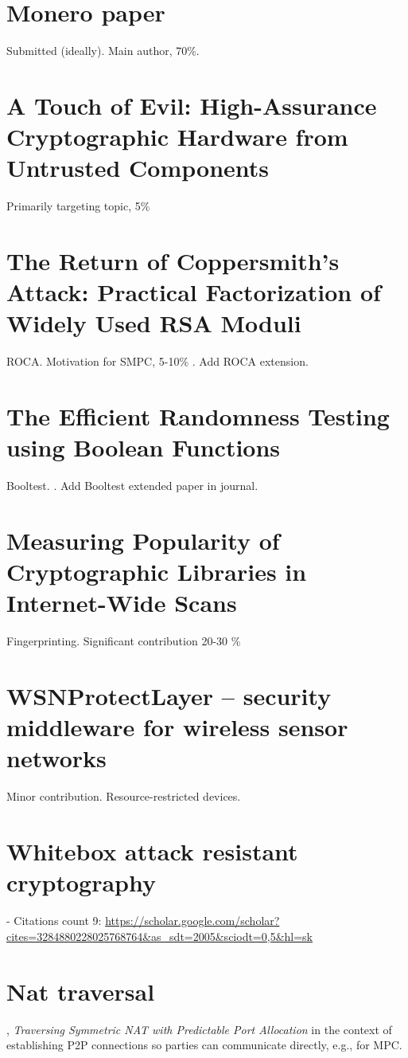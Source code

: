 \documentclass[
  digital, %
  twoside, %
  table,   %
  lof,     %
  lot,     %
]{fithesis3}
\newcounter{ph4_show_guides}
\theoremstyle{definition}
\theoremstyle{remark}
\begin{document}
\begin{ecmmnt} %
\section{Monero paper}
Submitted (ideally). Main author, 70\%.

\section{A Touch of Evil: High-Assurance Cryptographic Hardware from Untrusted Components}
Primarily targeting topic, 5\% \cite{2017-ccs-mavroudis}

\section{The Return of Coppersmith's Attack: Practical Factorization of Widely Used RSA Moduli}
ROCA. Motivation for SMPC, 5-10\% \cite{2017-ccs-nemec}.
Add ROCA extension.

\section{The Efficient Randomness Testing using Boolean Functions}
Booltest. \cite{booltest_secrypt2017}.
Add Booltest extended paper in journal.

\section{Measuring Popularity of Cryptographic Libraries in Internet-Wide Scans}
Fingerprinting. Significant contribution 20-30 \% \cite{2017-acsac-nemec}

\section{WSNProtectLayer – security middleware for wireless sensor networks}
Minor contribution. Resource-restricted devices. \cite{wsnprotectlayer}

\section{Whitebox attack resistant cryptography}
\cite{whitebox_klinec_santacrypt2013, Klinec2013thesis} 

- Citations count 9: \url{https://scholar.google.com/scholar?cites=3284880228025768764&as_sdt=2005&sciodt=0,5&hl=sk}

\section{Nat traversal}
\cite{Klinec:2014:TSN:2659651.2659698},
\emph{Traversing Symmetric NAT with Predictable Port Allocation} in the context of establishing P2P connections so parties can communicate directly, e.g., for MPC.



\end{ecmmnt}
\end{document}
